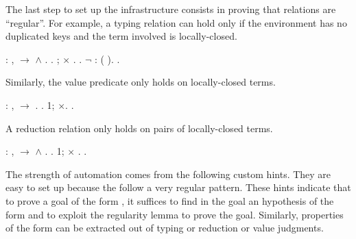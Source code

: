 \documentclass[12pt]{report}
\begin{document}
 The last step to set up the infrastructure consists in proving
    that relations are ``regular''. For example, a typing relation can 
    hold only if the environment has no duplicated keys and the term 
    involved is locally-closed. 
\begin{coqdoccode}
\coqdocemptyline
\coqdocnoindent
{}  : \coqdockw{\ensuremath{\forall}}   ,\coqdoceol
\coqdocindent{1.00em}
    \ensuremath{\rightarrow}   \ensuremath{\land}  .\coqdoceol
\coqdocnoindent
{}.\coqdoceol
\coqdocindent{1.00em}
; \ensuremath{\times} .\coqdoceol
\coqdocindent{1.00em}
 . \ensuremath{\lnot} : ( ).\coqdoceol
\coqdocnoindent
{}.\coqdoceol
\coqdocemptyline
\end{coqdoccode}
Similarly, the value predicate only holds on locally-closed terms. 
\begin{coqdoccode}
\coqdocemptyline
\coqdocnoindent
{}  : \coqdockw{\ensuremath{\forall}} ,\coqdoceol
\coqdocindent{1.00em}
  \ensuremath{\rightarrow}  .\coqdoceol
\coqdocnoindent
{}.  1; \ensuremath{\times}. .\coqdoceol
\coqdocemptyline
\end{coqdoccode}
A reduction relation only holds on pairs of locally-closed terms. 
\begin{coqdoccode}
\coqdocemptyline
\coqdocnoindent
{}  : \coqdockw{\ensuremath{\forall}}  ,\coqdoceol
\coqdocindent{1.00em}
   \ensuremath{\rightarrow}   \ensuremath{\land}  .\coqdoceol
\coqdocnoindent
{}.  1; \ensuremath{\times} . .\coqdoceol
\coqdocemptyline
\end{coqdoccode}
The strength of automation comes from the following custom hints.
    They are easy to set up because the follow a very regular pattern.
    These hints indicate that to prove a goal of the form  ,
    it suffices to find in the goal an hypothesis of the form
        and to exploit the regularity lemma 
    to prove the goal. Similarly, properties of the form  
    can be extracted out of typing or reduction or value judgments.
\end{document}
